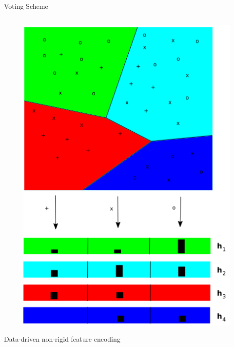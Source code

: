 \documentclass[final,hyperref={pdfpagelabels=false}]{beamer}
\begin{document}
\begin{frame}[t]
\begin{columns}[t]
\begin{column}{.465\textwidth}
\begin{block}{Voting Scheme}
\begin{columns}
\begin{column}{.43\textwidth} %
\centering
\begin{figure}
\includegraphics[width=0.5\linewidth]{featureEncoding2.png}%
\end{figure}

\begin{center}
{\small Data-driven non-rigid feature encoding}
\end{center}

\end{column}
\end{columns} %


\end{block}



\end{column}
\end{columns}
\end{frame}
\end{document}
